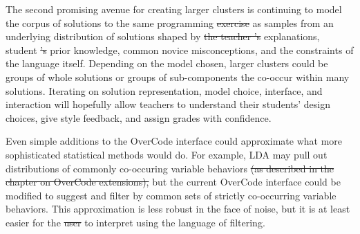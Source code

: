 \documentclass[12pt,twoside]{mitthesis}
\providecommand{\DIFaddtex}[1]{{\protect\color{blue}\uwave{#1}}} %
\providecommand{\DIFdeltex}[1]{{\protect\color{red}\sout{#1}}}                      %
\providecommand{\DIFaddbegin}{} %
\providecommand{\DIFaddend}{} %
\providecommand{\DIFdelbegin}{} %
\providecommand{\DIFdelend}{} %
\providecommand{\DIFadd}[1]{\texorpdfstring{\DIFaddtex{#1}}{#1}} %
\providecommand{\DIFdel}[1]{\texorpdfstring{\DIFdeltex{#1}}{}} %
\begin{document}
\DIFaddbegin 


\DIFaddend The second promising avenue for creating larger clusters is continuing to model the corpus of solutions to the same programming \DIFdelbegin \DIFdel{exercise }\DIFdelend \DIFaddbegin \DIFadd{problem }\DIFaddend as samples from an underlying distribution of solutions shaped by \DIFdelbegin \DIFdel{the teacher 's }\DIFdelend \DIFaddbegin \DIFadd{teacher }\DIFaddend explanations, student \DIFdelbegin \DIFdel{'s }\DIFdelend prior knowledge, common novice misconceptions, and the constraints of the language itself. Depending on the model chosen, larger clusters could be groups of whole solutions or groups of sub-components the co-occur within many solutions. Iterating on solution representation, model choice, interface, and interaction will hopefully allow teachers to understand their students' design choices, give style feedback, and assign grades with confidence. 

Even simple additions to the OverCode interface could approximate what more sophisticated statistical methods would do. For example, LDA may pull out distributions of commonly co-occuring variable behaviors \DIFdelbegin \DIFdel{(as described in the chapter on OverCode extensions), }\DIFdelend but the current OverCode interface could be modified to suggest and filter by common sets of strictly co-occurring variable behaviors. This approximation is less robust in the face of noise, but it is at least easier for the \DIFdelbegin \DIFdel{user }\DIFdelend \DIFaddbegin \DIFadd{teacher }\DIFaddend to interpret using the language of filtering. %
\end{document}
